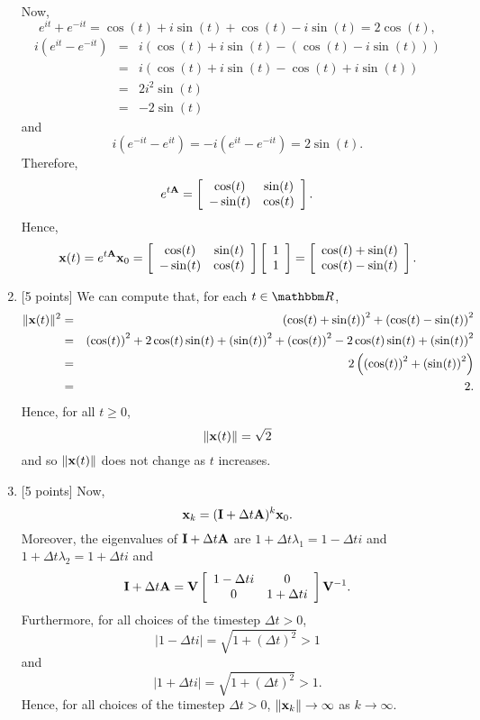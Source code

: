 \begin{solution}
\begin{enumerate}
\begin{eqnarray*}
\end{eqnarray*}
Now,
\[
e^{it} + e^{-it}=\cos(t)+i\sin(t)+\cos(t)-i\sin(t)=2\cos(t),
\]
\begin{eqnarray*}
i\left(e^{it} - e^{-it}\right)&=&i\left(\cos(t)+i\sin(t)-\left(\cos(t)-i\sin(t)\right)\right)
\\
&=&i\left(\cos(t)+i\sin(t)-\cos(t)+i\sin(t)\right)
\\
&=&2i^2\sin(t)
\\
&=&-2\sin(t)
\end{eqnarray*}
and
\[
i\left(e^{-it} - e^{it}\right)=-i\left(e^{it} - e^{-it}\right)=2\sin(t).
\]
Therefore,
\[
e^{t{\bf A}} = \left[\begin{array}{cc}\cos(t) & \sin(t) \\ -\sin(t) & \cos(t)\end{array}\right].
\]
Hence,
\[
{\bf x}(t) = e^{t{\bf A}} {\bf x}_0 = \left[\begin{array}{cc}\cos(t) & \sin(t) \\ -\sin(t) & \cos(t)\end{array}\right]\left[\begin{array}{c}1 \\ 1\end{array}\right] = \left[\begin{array}{c}\cos(t)+\sin(t) \\ \cos(t)-\sin(t)\end{array}\right].
\]

\item {[5 points]} We can compute that, for each $t\in\R$,
\begin{eqnarray*}
\|{\bf x}(t)\|^2&=&\left(\cos(t)+\sin(t)\right)^2+\left(\cos(t)-\sin(t)\right)^2
\\
&=&\left(\cos(t)\right)^2+2\cos(t)\sin(t)+\left(\sin(t)\right)^2+\left(\cos(t)\right)^2-2\cos(t)\sin(t)+\left(\sin(t)\right)^2
\\
&=&2\left(\left(\cos(t)\right)^2+\left(\sin(t)\right)^2\right)
\\
&=&2.
\end{eqnarray*}
Hence, for all  $t\ge0$,
\[
\|{\bf x}(t)\|=\sqrt{2}
\]
and so $\|{\bf x}(t)\|$ does not change as $t$ increases.

\item {[5 points]} Now,
\[
{\bf x}_k = ({\bf I}+\Delta t {\bf A})^k {\bf x}_0.
\]
Moreover, the eigenvalues of ${\bf I}+\Delta t {\bf A}$ are $1+\Delta t \lambda_1 = 1-\Delta t i$ and $1+\Delta t \lambda_2 = 1+\Delta ti$ and
\[
{\bf I}+\Delta t {\bf A}={\bf V} \left[\begin{array}{cc}1-\Delta ti & 0 \\ 0 & 1+\Delta ti\end{array}\right] {\bf V}^{-1}.
\]
Furthermore, for all choices of the timestep $\Delta t>0$,
\[
\left|1-\Delta t i\right|=\sqrt{1+\left(\Delta t\right)^2}>1
\]
and
\[
\left|1+\Delta t i\right|=\sqrt{1+\left(\Delta t\right)^2}>1.
\]
Hence, for all choices of the timestep $\Delta t>0$, $\|{\bf x}_k\|\rightarrow\infty$ as $k\to\infty$.


\end{enumerate}
\end{solution}

